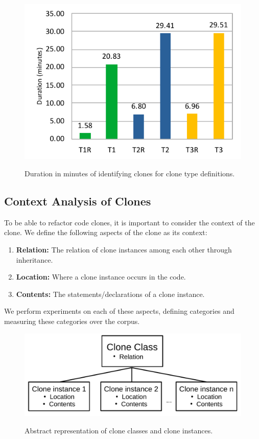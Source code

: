 \documentclass[a4paper]{article}
\begin{document}
\begin{figure}[H]
  \caption{Duration in minutes of identifying clones for clone type definitions.}
    \includegraphics[width=.9\columnwidth]{img/DurationChart}
  \label{fig:performance}
\end{figure}

\subsection{Context Analysis of Clones}\label{chap:clonecontextexpl}
To be able to refactor code clones, it is important to consider the context of the clone. We define the following aspects of the clone as its context:
\begin{enumerate}
  \item \textbf{Relation:} The relation of clone instances among each other through inheritance.
  \item \textbf{Location:} Where a clone instance occurs in the code.
  \item \textbf{Contents:} The statements/declarations of a clone instance.
\end{enumerate}
We perform experiments on each of these aspects, defining categories and measuring these categories over the corpus.

\begin{figure}[H]
  \caption{Abstract representation of clone classes and clone instances.}
    \medskip
    \includegraphics[width=1\columnwidth]{img/context}
  \label{fig:clonecontext}
\end{figure}
\end{document}
